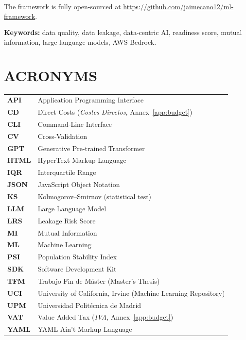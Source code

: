 \documentclass[12pt,a4paper]{report}
\begin{document}
The framework is fully open-sourced at
\url{https://github.com/jaimecano12/ml-framework}.

\textbf{Keywords:} data quality, data leakage, data-centric AI, readiness score, mutual
information, large language models, AWS Bedrock.

\chapter*{ACRONYMS}

\begin{tabular}{@{}p{2.2cm}p{12cm}@{}}
\textbf{API}    & Application Programming Interface \\
\textbf{CD}     & Direct Costs (\textit{Costes Directos}, Annex~\ref{app:budget}) \\
\textbf{CLI}    & Command-Line Interface \\
\textbf{CV}     & Cross-Validation \\
\textbf{GPT}    & Generative Pre-trained Transformer \\
\textbf{HTML}   & HyperText Markup Language \\
\textbf{IQR}    & Interquartile Range \\
\textbf{JSON}   & JavaScript Object Notation \\
\textbf{KS}     & Kolmogorov--Smirnov (statistical test) \\
\textbf{LLM}    & Large Language Model \\
\textbf{LRS}    & Leakage Risk Score \\
\textbf{MI}     & Mutual Information \\
\textbf{ML}     & Machine Learning \\
\textbf{PSI}    & Population Stability Index \\
\textbf{SDK}    & Software Development Kit \\
\textbf{TFM}    & Trabajo Fin de M\'aster (Master's Thesis) \\
\textbf{UCI}    & University of California, Irvine (Machine Learning Repository) \\
\textbf{UPM}    & Universidad Polit\'ecnica de Madrid \\
\textbf{VAT}    & Value Added Tax (\textit{IVA}, Annex~\ref{app:budget}) \\
\textbf{YAML}   & YAML Ain't Markup Language \\
\end{tabular}
\end{document}
